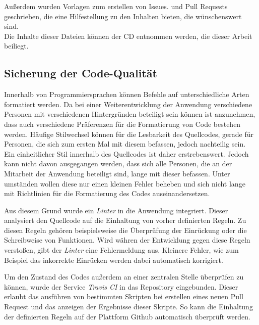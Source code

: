 Außerdem wurden Vorlagen zum erstellen von Issues\footnotemark{}. und Pull Requests geschrieben, die eine Hilfestellung zu den Inhalten bieten, die wünschenswert sind.\\
Die Inhalte dieser Dateien können der CD entnommen werden, die dieser Arbeit beiliegt.


\subsection{Sicherung der Code-Qualität}
Innerhalb von Programmiersprachen können Befehle auf unterschiedliche Arten formatiert werden. Da bei einer Weiterentwicklung der Anwendung verschiedene Personen mit verschiedenen Hintergründen beteiligt sein können ist anzunehmen, dass auch verschiedene Präferenzen für die Formatierung von Code bestehen werden.
Häufige Stilwechsel können für die Lesbarkeit des Quellcodes, gerade für Personen, die sich zum ersten Mal mit diesem befassen, jedoch nachteilig sein. Ein einheitlicher Stil innerhalb des Quellcodes ist daher erstrebenswert. Jedoch kann nicht davon ausgegangen werden, dass sich alle Personen, die an der Mitarbeit der Anwendung beteiligt sind, lange mit dieser befassen. Unter umständen wollen diese nur einen kleinen Fehler beheben und sich nicht lange mit Richtlinien für die Formatierung des Codes auseinandersetzen.

Aus diesem Grund wurde ein \textit{Linter} in die Anwendung integriert. Dieser analysiert den Quellcode auf die Einhaltung von vorher definierten Regeln. Zu diesen Regeln gehören beispielsweise die Überprüfung der Einrückung oder die Schreibweise von Funktionen.
Wird währen der Entwicklung gegen diese Regeln verstoßen, gibt der \textit{Linter} eine Fehlermeldung aus. Kleinere Fehler, wie zum Beispiel das inkorrekte Einrücken werden dabei automatisch korrigiert.

Um den Zustand des Codes außerdem an einer zentralen Stelle überprüfen zu können, wurde der Service \textit{Travis CI}\footnotemark{} in das Repository eingebunden. Dieser erlaubt das ausführen von bestimmten Skripten bei erstellen eines neuen Pull Request und das anzeigen der Ergebnisse dieser Skripte. So kann die Einhaltung der definierten Regeln auf der Plattform Github automatisch überprüft werden.


